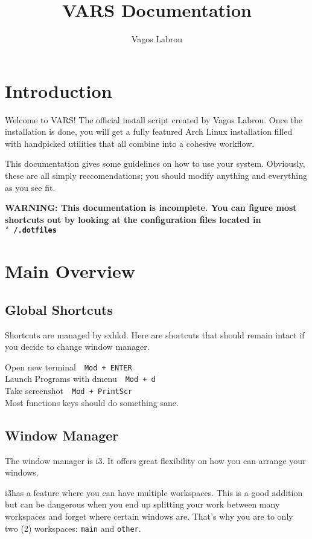 \documentclass{article}
\author{Vagos Labrou}
\title{VARS Documentation}
\date{}
\let\src\texttt
\newcommand{\shortcut}[2]{#1~\dotfill{}~\src{#2}\\} %
\newcommand{\me}{Vagos Labrou}
\newcommand{\wm}{i3}
\newcommand{\shrtcm}{sxhkd}
\begin{document}
\maketitle
\tableofcontents

\section{Introduction}

Welcome to VARS! The official install script created by \me. Once the installation 
is done, you will get a fully featured Arch Linux installation filled with handpicked 
utilities that all combine into a cohesive workflow.

This documentation gives some guidelines on how to use your system. Obviously, 
these are all simply reccomendations; you should modify anything and everything
as you see fit.

\textbf{WARNING: This documentation is incomplete. You can figure most shortcuts out 
by looking at the configuration files located in 
\src{\char`~/.dotfiles}}

\section{Main Overview}

\subsection{Global Shortcuts}

Shortcuts are managed by \shrtcm. Here are shortcuts that 
should remain intact if you decide to change window manager.

\begin{minipage}{\textwidth}

\shortcut{Open new terminal}{Mod + ENTER}
\shortcut{Launch Programs with dmenu}{Mod + d}
\shortcut{Take screenshot}{Mod + PrintScr}

Most functions keys should do something sane.

\end{minipage}


\subsection{Window Manager}

The window manager is \wm. It offers great flexibility on how you 
can arrange your windows. 

\wm has a feature where you can have multiple workspaces. 
This is a good addition but can be dangerous when you end 
up splitting your work between many workspaces and forget 
where certain windows are. 
That's why you are  to only two (2) workspaces: \src{main} and \src{other}.
\end{document}
